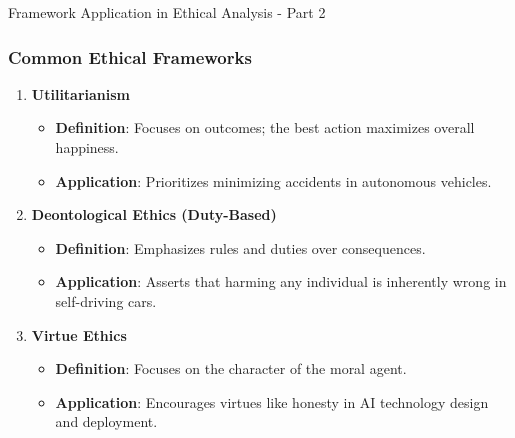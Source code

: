 \documentclass[aspectratio=169]{beamer}
\begin{document}
\begin{frame}[fragile]{Framework Application in Ethical Analysis - Part 2}
    \frametitle{Common Ethical Frameworks}
    \begin{enumerate}
        \item \textbf{Utilitarianism}
            \begin{itemize}
                \item \textbf{Definition}: Focuses on outcomes; the best action maximizes overall happiness.
                \item \textbf{Application}: Prioritizes minimizing accidents in autonomous vehicles.
            \end{itemize}
        
        \item \textbf{Deontological Ethics (Duty-Based)}
            \begin{itemize}
                \item \textbf{Definition}: Emphasizes rules and duties over consequences.
                \item \textbf{Application}: Asserts that harming any individual is inherently wrong in self-driving cars.
            \end{itemize}
        
        \item \textbf{Virtue Ethics}
            \begin{itemize}
                \item \textbf{Definition}: Focuses on the character of the moral agent.
                \item \textbf{Application}: Encourages virtues like honesty in AI technology design and deployment.
            \end{itemize}
    \end{enumerate}
\end{frame}
\end{document}

